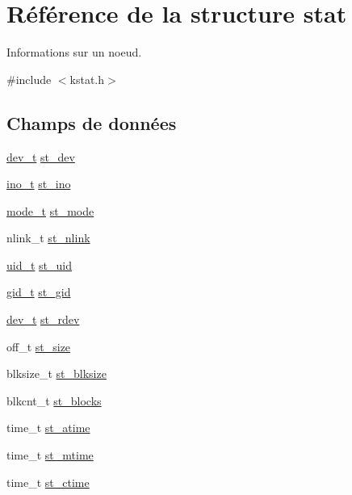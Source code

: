 \hypertarget{structstat}{\section{\-Référence de la structure stat}
\label{structstat}
}


\-Informations sur un noeud.  




{\ttfamily \#include $<$kstat.\-h$>$}

\subsection*{\-Champs de données}
\begin{DoxyCompactItemize}
\item 
\hyperlink{kstat_8h_a451f1b5788fa7cc5d33db47a5992e7a6}{dev\-\_\-t} \hyperlink{structstat_ac5b90090ae323741ae4c9e4f3683a29f}{st\-\_\-dev}
\item 
\hyperlink{kstat_8h_aed4e918b44240739869c4bdb1c4787a9}{ino\-\_\-t} \hyperlink{structstat_a9769ed8f0d4c5a9f329c32bc92479d56}{st\-\_\-ino}
\item 
\hyperlink{kstat_8h_af8f4385bb42836d1e3ad4fea9d71d1b9}{mode\-\_\-t} \hyperlink{structstat_a5cbdd829011af82ba61e83773bbcbc7d}{st\-\_\-mode}
\item 
nlink\-\_\-t \hyperlink{structstat_a0ed9092fa6c77a3251b9b9a4738ef84f}{st\-\_\-nlink}
\item 
\hyperlink{kstat_8h_af2306308627701b66dc6f3babe821ab4}{uid\-\_\-t} \hyperlink{structstat_a4a8708a3d18be60ee7b2f06c4cab0c70}{st\-\_\-uid}
\item 
\hyperlink{kstat_8h_aa7352f1065fe606194d792e2b292cf83}{gid\-\_\-t} \hyperlink{structstat_ab864f16f436cec370f0ced585d897698}{st\-\_\-gid}
\item 
\hyperlink{kstat_8h_a451f1b5788fa7cc5d33db47a5992e7a6}{dev\-\_\-t} \hyperlink{structstat_aa61e6c1a8a91c69f1d26f6700a0546cb}{st\-\_\-rdev}
\item 
off\-\_\-t \hyperlink{structstat_a040e19c8b9766f841fde8786ce9297bf}{st\-\_\-size}
\item 
blksize\-\_\-t \hyperlink{structstat_a38d474e1ae3cf6fbdde89ac3c3e308f1}{st\-\_\-blksize}
\item 
blkcnt\-\_\-t \hyperlink{structstat_a42dd716b2f9234f961d949fc9500eefb}{st\-\_\-blocks}
\item 
time\-\_\-t \hyperlink{structstat_ab74d1e7e345e88b9d0fb2688a97cba64}{st\-\_\-atime}
\item 
time\-\_\-t \hyperlink{structstat_a77e235090f8cb6897f1c0ce65689006b}{st\-\_\-mtime}
\item 
time\-\_\-t \hyperlink{structstat_a1b4b858db1ebe79c3d6e0fc1ef721024}{st\-\_\-ctime}
\end{DoxyCompactItemize}


